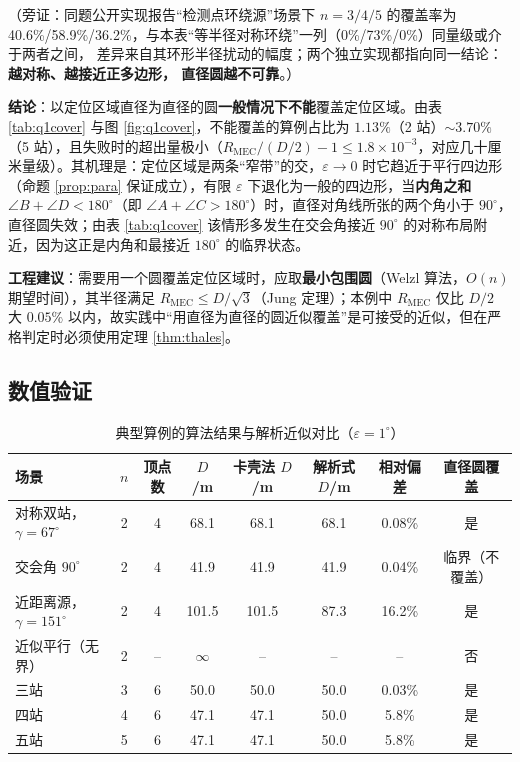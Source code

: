 （旁证：同题公开实现\cite{cumcm2026b-gh}报告“检测点环绕源”场景下 $n=3/4/5$ 的覆盖率为
40.6\%/58.9\%/36.2\%，与本表“等半径对称环绕”一列（0\%/73\%/0\%）同量级或介于两者之间，
差异来自其环形半径扰动的幅度；两个独立实现都指向同一结论：\textbf{越对称、越接近正多边形，
直径圆越不可靠}。）

\textbf{结论}：以定位区域直径为直径的圆\textbf{一般情况下不能}覆盖定位区域。由表 \ref{tab:q1cover} 与图 \ref{fig:q1cover}，不能覆盖的算例占比为 $1.13\%$（2 站）$\sim3.70\%$（5 站），且失败时的超出量极小（$R_{\mathrm{MEC}}/(D/2)-1\le1.8\times10^{-3}$，对应几十厘米量级）。其机理是：定位区域是两条“窄带”的交，$\varepsilon\to0$ 时它趋近于平行四边形（命题 \ref{prop:para} 保证成立），有限 $\varepsilon$ 下退化为一般的四边形，当\textbf{内角之和} $\angle B+\angle D<180^{\circ}$（即 $\angle A+\angle C>180^{\circ}$）时，直径对角线所张的两个角小于 $90^{\circ}$，直径圆失效；由表 \ref{tab:q1cover} 该情形多发生在交会角接近 $90^{\circ}$ 的对称布局附近，因为这正是内角和最接近 $180^{\circ}$ 的临界状态。

\textbf{工程建议}：需要用一个圆覆盖定位区域时，应取\textbf{最小包围圆}（Welzl 算法，$O(n)$ 期望时间），其半径满足 $R_{\mathrm{MEC}}\le D/\sqrt3$（Jung 定理）；本例中 $R_{\mathrm{MEC}}$ 仅比 $D/2$ 大 $0.05\%$ 以内，故实践中“用直径为直径的圆近似覆盖”是可接受的近似，但在严格判定时必须使用定理 \ref{thm:thales}。

\subsection{数值验证}

\begin{table}[H]
\centering
\caption{典型算例的算法结果与解析近似对比（$\varepsilon=1^{\circ}$）}
\label{tab:q1cases}
\small
\begin{tabular}{lccccccc}
\toprule
场景 & $n$ & 顶点数 & $D$/m & 卡壳法 $D$/m & 解析式 $D$/m & 相对偏差 & 直径圆覆盖\\
\midrule
对称双站，$\gamma=67^{\circ}$ & 2 & 4 & 68.1 & 68.1 & 68.1 & 0.08\% & 是\\
交会角 $90^{\circ}$ & 2 & 4 & 41.9 & 41.9 & 41.9 & 0.04\% & 临界（不覆盖）\\
近距离源，$\gamma=151^{\circ}$ & 2 & 4 & 101.5 & 101.5 & 87.3 & 16.2\% & 是\\
近似平行（无界） & 2 & -- & $\infty$ & -- & -- & -- & 否\\
三站 & 3 & 6 & 50.0 & 50.0 & 50.0 & 0.03\% & 是\\
四站 & 4 & 6 & 47.1 & 47.1 & 50.0 & 5.8\% & 是\\
五站 & 5 & 6 & 47.1 & 47.1 & 50.0 & 5.8\% & 是\\
\bottomrule
\end{tabular}
\end{table}

